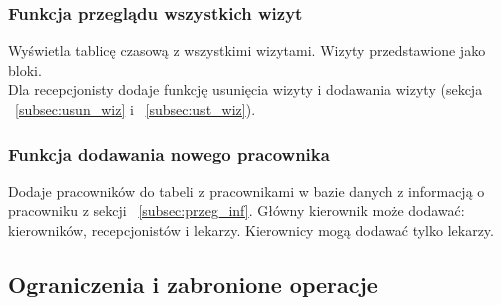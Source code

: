 \begin{flushleft}
    \subsubsection{\large{Funkcja przeglądu wszystkich wizyt}\label{subsec:przeg_wiz}}
    Wyświetla tablicę czasową z wszystkimi wizytami. Wizyty przedstawione jako bloki. \\
    Dla recepcjonisty dodaje funkcję usunięcia wizyty i dodawania wizyty (sekcja  ~\ref{subsec:usun_wiz} i ~\ref{subsec:ust_wiz}).
\end{flushleft}

\begin{flushleft}
    \subsubsection{\large{Funkcja dodawania nowego pracownika}\label{subsec:dodn_prac}}
    Dodaje pracowników do tabeli z pracownikami w bazie danych z informacją o pracowniku z sekcji ~\ref{subsec:przeg_inf}. Główny kierownik może dodawać: kierowników, recepcjonistów i lekarzy. Kierownicy mogą dodawać tylko lekarzy.
\end{flushleft}


\begin{flushleft}
\subsection{\Large{Ograniczenia i zabronione operacje}}
\end{flushleft}

